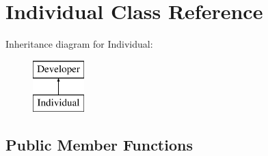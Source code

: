 \hypertarget{class_individual}{\section{Individual Class Reference}
\label{class_individual}
}
Inheritance diagram for Individual\+:\begin{figure}[H]
\begin{center}
\leavevmode
\includegraphics[height=2.000000cm]{class_individual}
\end{center}
\end{figure}
\subsection*{Public Member Functions}
